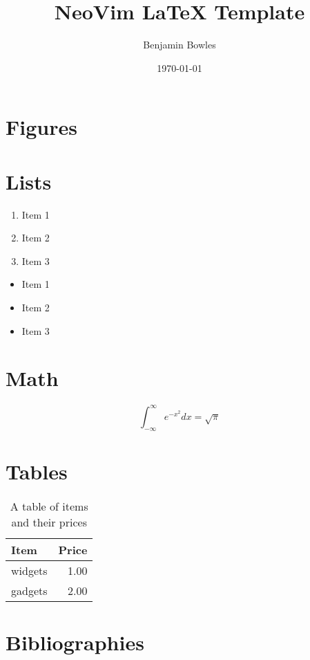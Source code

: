 \documentclass[12pt]{article}
\title{NeoVim LaTeX Template}
\author{Benjamin Bowles}
\date{\today}
\begin{document}
\maketitle
\newpage

\tableofcontents
\newpage

\section{Figures}


\section{Lists}
\begin{enumerate}
    \item  Item 1
    \item  Item 2
    \item  Item 3
\end{enumerate}
\begin{itemize}
    \item  Item 1
    \item  Item 2
    \item  Item 3
\end{itemize}

\section{Math}
\begin{equation}
    \int_{-\infty}^{\infty} e^{-x^2} dx = \sqrt{\pi}
\end{equation}

\section{Tables}
\begin{table}[h]
\centering
\begin{tabular}{l|r}
    Item & Price \\\hline
    widgets & 1.00 \\
    gadgets & 2.00 \\
\end{tabular}
\caption{\label{tab:widgets}A table of items and their prices}
\end{table}

\section{Bibliographies}
\cite{TestBook}
\cite{TestArticle}




\end{document}
